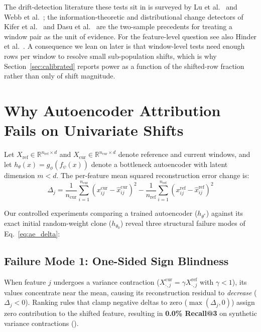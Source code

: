 \documentclass[10pt,conference]{IEEEtran}
\begin{document}
The drift-detection literature these tests sit in is surveyed by Lu et
al.~\cite{lu2018learning} and Webb et al.~\cite{webb2018analysing}; the
information-theoretic and distributional change detectors of Kifer et
al.~\cite{kifer2004detecting} and Dasu et al.~\cite{dasu2006information} are the
two-sample precedents for treating a window pair as the unit of evidence. For
the feature-level question see also Hinder et al.~\cite{hinder2023explain}. A
consequence we lean on later is that window-level tests need enough rows per
window to resolve small sub-population shifts, which is why
Section~\ref{sec:calibrated} reports power as a function of the shifted-row
fraction rather than only of shift magnitude.

\section{Why Autoencoder Attribution Fails on Univariate Shifts}
\label{sec:diagnosis}

Let $X_{\mathrm{ref}} \in \mathbb{R}^{n_{\mathrm{ref}} \times d}$ and
$X_{\mathrm{cur}} \in \mathbb{R}^{n_{\mathrm{cur}} \times d}$ denote reference
and current windows, and let $h_\theta(x) = g_\phi(f_\psi(x))$ denote a
bottleneck autoencoder with latent dimension $m < d$. The per-feature mean
squared reconstruction error change is:
\begin{equation}
  \Delta_j = \frac{1}{n_{\mathrm{cur}}}\sum_{i=1}^{n_{\mathrm{cur}}}
             \left(x^{\mathrm{cur}}_{ij} - \hat{x}^{\mathrm{cur}}_{ij}\right)^2
           - \frac{1}{n_{\mathrm{ref}}}\sum_{i=1}^{n_{\mathrm{ref}}}
             \left(x^{\mathrm{ref}}_{ij} - \hat{x}^{\mathrm{ref}}_{ij}\right)^2
  \label{eq:ae_delta}
\end{equation}

Our controlled experiments comparing a trained autoencoder ($h_{\theta^*}$)
against its exact initial random-weight clone ($h_{\theta_0}$) reveal three
structural failure modes of Eq.~\eqref{eq:ae_delta}:

\subsection{Failure Mode 1: One-Sided Sign Blindness}
When feature $j$ undergoes a variance contraction ($X^{\mathrm{cur}}_{\cdot, j} = \gamma X^{\mathrm{ref}}_{\cdot, j}$ with $\gamma < 1$), its values concentrate near the mean, causing its reconstruction residual to \emph{decrease} ($\Delta_j < 0$). Ranking rules that clamp negative deltas to zero ($\max(\Delta_j, 0)$) assign zero contribution to the shifted feature, resulting in \textbf{0.0\% Recall@3} on synthetic variance contractions ().
\end{document}
